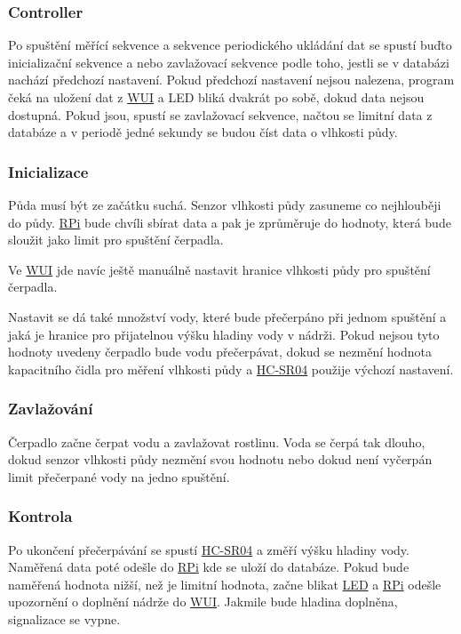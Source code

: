 \documentclass[12pt,a4paper]{article}
\begin{document}
\subsubsection{Controller}

Po spuštění měřící sekvence a sekvence periodického ukládání dat se spustí buďto inicializační sekvence a nebo zavlažovací sekvence podle toho, jestli se v databázi nachází předchozí nastavení. Pokud předchozí nastavení nejsou nalezena, program čeká na uložení dat z \space \underline{\ac{WUI}} a \ac{LED} bliká dvakrát po sobě, dokud data nejsou dostupná. Pokud jsou, spustí se zavlažovací sekvence, načtou se limitní data z databáze a v periodě jedné sekundy se budou číst data o vlhkosti půdy.

\subsubsection{Inicializace}

Půda musí být ze začátku suchá. Senzor vlhkosti půdy zasuneme co nejhlouběji do půdy. \underline{\ac{RPi}} bude chvíli sbírat data a pak je zprůměruje do hodnoty, která bude sloužit jako limit pro spuštění čerpadla.

Ve \underline{\ac{WUI}} jde navíc ještě manuálně nastavit hranice vlhkosti půdy pro spuštění čerpadla.

Nastavit se dá také množství vody, které bude přečerpáno při jednom spuštění a jaká je hranice pro přijatelnou výšku hladiny vody v nádrži. Pokud nejsou tyto hodnoty uvedeny čerpadlo bude vodu přečerpávat, dokud se nezmění hodnota kapacitního čidla pro měření vlhkosti půdy a \space \underline{\ac{HC-SR04}} použije výchozí nastavení.

\subsubsection{Zavlažování}

Čerpadlo začne čerpat vodu a zavlažovat rostlinu. Voda se čerpá tak dlouho, dokud senzor vlhkosti půdy nezmění svou hodnotu nebo dokud není vyčerpán limit přečerpané vody na jedno spuštění.

\subsubsection{Kontrola}

Po ukončení přečerpávání se spustí \underline{\ac{HC-SR04}} a změří výšku hladiny vody. Naměřená data poté odešle do \underline{\ac{RPi}} kde se uloží do databáze. Pokud bude naměřená hodnota nižší, než je limitní hodnota, začne blikat \underline{\ac{LED}} a \underline{\ac{RPi}} odešle upozornění o doplnění nádrže do \underline{\ac{WUI}}. Jakmile bude hladina doplněna, signalizace se vypne.
\end{document}
